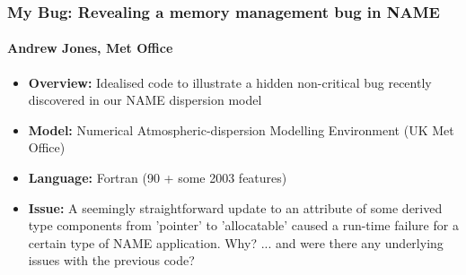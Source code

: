 \documentclass{beamer}
\begin{document}
  \begin{frame}
    \frametitle{My Bug: Revealing a memory management bug in NAME}
    \framesubtitle{Andrew Jones, Met Office}
    \begin{itemize}
       \item  {\bf Overview:} Idealised code to illustrate a hidden non-critical bug
                              recently discovered in our NAME dispersion model
       \item  {\bf Model:}    Numerical Atmospheric-dispersion Modelling Environment
                              (UK Met Office)
       \item  {\bf Language:} Fortran (90 + some 2003 features)
       \item  {\bf Issue:}    A seemingly straightforward update to an attribute of some
                              derived type components from 'pointer' to 'allocatable'
                              caused a run-time failure for a certain type of NAME
                              application. Why? ... and were there any underlying
                              issues with the previous code?
    \end{itemize}
  \end{frame}
\end{document}
